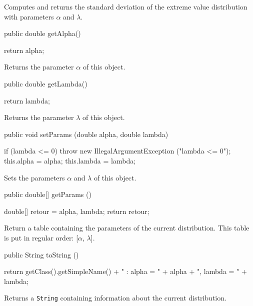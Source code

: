 \begin{tabb}  Computes and returns the standard deviation
   of the extreme value distribution with parameters $\alpha$ and $\lambda$.
\end{tabb}
\begin{htmlonly}
\end{htmlonly}
\begin{code}

   public double getAlpha()\begin{hide} {
      return alpha;
   }\end{hide}
\end{code}
  \begin{tabb} Returns the parameter $\alpha$ of this object.
  \end{tabb}
\begin{code}

   public double getLambda()\begin{hide} {
      return lambda;
   }
\end{hide}
\end{code}
 \begin{tabb}
   Returns the parameter $\lambda$ of this object.
 \end{tabb}
\begin{code}

   public void setParams (double alpha, double lambda)\begin{hide} {
     if (lambda <= 0)
         throw new IllegalArgumentException ("lambda <= 0");
      this.alpha  = alpha;
      this.lambda = lambda;
   }\end{hide}
\end{code}
 \begin{tabb}
   Sets the parameters $\alpha$ and $\lambda$ of this object.
 \end{tabb}
\begin{code}

   public double[] getParams ()\begin{hide} {
      double[] retour = {alpha, lambda};
      return retour;
   }\end{hide}
\end{code}
\begin{tabb}
   Return a table containing the parameters of the current distribution.
   This table is put in regular order: [$\alpha$, $\lambda$].
\end{tabb}
\begin{hide}\begin{code}

   public String toString ()\begin{hide} {
      return getClass().getSimpleName() + " : alpha = " + alpha + ", lambda = " + lambda;
   }\end{hide}
\end{code}
\begin{tabb}
   Returns a \texttt{String} containing information about the current distribution.
\end{tabb}\end{hide}
\begin{code}\begin{hide}
}\end{hide}
\end{code}
